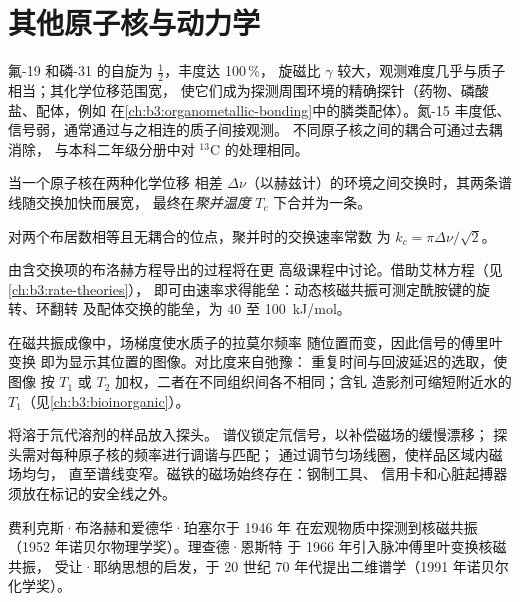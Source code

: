 \section{其他原子核与动力学}

氟-19 和磷-31 的自旋为 $\frac12$，丰度达 100\,\%，
旋磁比 $\gamma$ 较大，观测难度几乎与质子相当；其化学位移范围宽，
使它们成为探测周围环境的精确探针（药物、磷酸盐、配体，例如
在\cref{ch:b3:organometallic-bonding}中的膦类配体）。氮-15 丰度低、
信号弱，通常通过与之相连的质子间接观测。
不同原子核之间的耦合可通过去耦消除，
与本科二年级分册中对 ${}^{13}$C 的处理相同。

\begin{definition}[聚并温度]\label{def:b3:advanced-nmr:coalescence}
当一个原子核在两种化学位移
相差 $\Delta\nu$（以赫兹计）的环境之间交换时，其两条谱线随交换加快而展宽，
最终在\emph{聚并温度}
$T_c$ 下合并为一条。
\end{definition}

\begin{proposition}[聚并时的速率]\label{prop:b3:advanced-nmr:coalescence}
对两个布居数相等且无耦合的位点，聚并时的交换速率常数
为 $k_c = \pi\Delta\nu/\sqrt2$。
\end{proposition}
\admitted

由含交换项的布洛赫方程导出的过程将在更
高级课程中讨论。借助艾林方程（见\cref{ch:b3:rate-theories}），
即可由速率求得能垒：动态核磁共振可测定酰胺键的旋转、环翻转
及配体交换的能垒，为 40 至 \qty{100}{kJ/mol}。

\begin{example}[一幅 MRI 图像]\label{ex:b3:advanced-nmr:mri}
在磁共振成像中，场梯度使水质子的拉莫尔频率
随位置而变，因此信号的傅里叶变换
即为显示其位置的图像。对比度来自弛豫：
重复时间与回波延迟的选取，使图像
按 $T_1$ 或 $T_2$ 加权，二者在不同组织间各不相同；含钆
造影剂可缩短附近水的 $T_1$（见\cref{ch:b3:bioinorganic}）。
\end{example}

\begin{inthelab}[准备谱仪]
将溶于氘代溶剂的样品放入探头。
谱仪锁定氘信号，以补偿磁场的缓慢漂移；
探头需对每种原子核的频率进行调谐与匹配；
通过调节匀场线圈，使样品区域内磁场均匀，
直至谱线变窄。磁铁的磁场始终存在：钢制工具、
信用卡和心脏起搏器须放在标记的安全线之外。
\end{inthelab}

\begin{history}[从共振到二维谱]
费利克斯·布洛赫和爱德华·珀塞尔于 1946 年
在宏观物质中探测到核磁共振（1952 年诺贝尔物理学奖）。理查德·恩斯特
于 1966 年引入脉冲傅里叶变换核磁共振，
受让·耶纳思想的启发，于 20 世纪 70 年代提出二维谱学（1991 年诺贝尔化学奖）。
\end{history}

